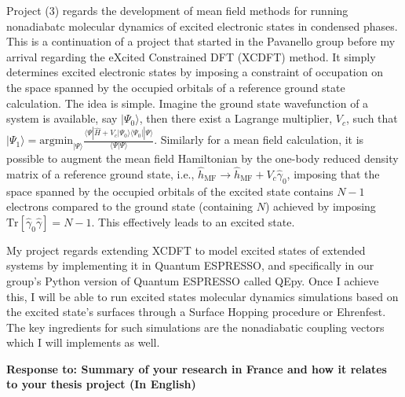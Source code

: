 \documentclass[notitlepage,12pt]{report}
\renewcommand{\ket}[1]{\left| #1 \right. \rangle}
\renewcommand{\bra}[1]{\langle \left. #1 \right|}
\renewcommand{\braket}[2]{\langle #1 \left| #2 \right. \rangle}
\newcommand{\braopket}[3]{\langle #1 \left| #2 \right| #3 \rangle}
\begin{document}
Project (3) regards the development of mean field methods for running nonadiabatc molecular dynamics of excited electronic states in condensed phases. This is a continuation of a project that started in the Pavanello group before my arrival regarding the eXcited Constrained DFT (XCDFT) method. It simply determines excited electronic states by imposing a constraint of occupation on the space spanned by the occupied orbitals of a reference ground state calculation. The idea is simple. Imagine the ground state wavefunction of a system is available, say $\ket{\Psi_0}$, then there exist a Lagrange multiplier, $V_c$, such that $\ket{\Psi_1}=\text{argmin}_{\ket{\Psi}} \frac{\braopket{\Psi}{\hat H + V_c \ket{\Psi_0}\bra{\Psi_0}}{\Psi}}{\braket{\Psi}{\Psi}}$. Similarly for a mean field calculation, it is possible to augment the mean field Hamiltonian by the one-body reduced density matrix of a reference ground state, i.e., $\hat h_\text{MF} \to \hat h_\text{MF} + V_c \hat\gamma_0$, imposing that the space spanned by the occupied orbitals of the excited state contains $N-1$ electrons compared to the ground state (containing $N$) achieved by imposing $\text{Tr}\left[ \hat\gamma_0 \hat\gamma \right]=N-1$. This effectively leads to an excited state.

My project regards extending XCDFT to model excited states of extended systems by implementing it in Quantum ESPRESSO, and specifically in our group's Python version of Quantum ESPRESSO called QEpy. Once I achieve this, I will be able to run excited states molecular dynamics simulations based on the excited state's surfaces through a Surface Hopping procedure or Ehrenfest. The key ingredients for such simulations are the nonadiabatic coupling vectors which I will implements as well. 

\newpage
\begin{center}
    \textbf{Response to: Summary of your research in France and how it relates to your thesis project (In English)}
\end{center}
\end{document}
